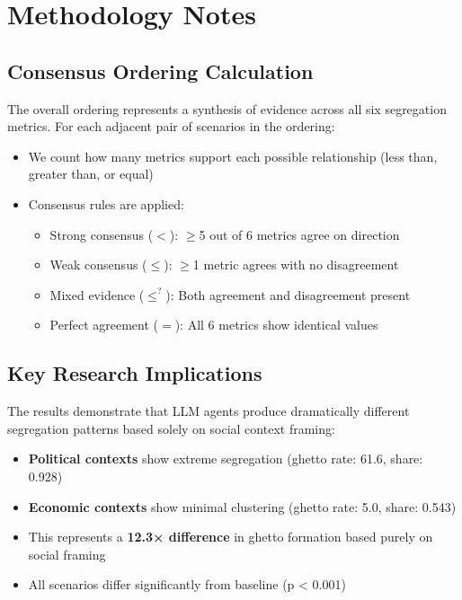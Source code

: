 \documentclass[11pt]{article}
\begin{document}


\section{Methodology Notes}

\subsection{Consensus Ordering Calculation}

The overall ordering represents a synthesis of evidence across all six segregation metrics. For each adjacent pair of scenarios in the ordering:

\begin{itemize}
\item We count how many metrics support each possible relationship (less than, greater than, or equal)
\item Consensus rules are applied:
  \begin{itemize}
  \item Strong consensus ($<$): $\geq$5 out of 6 metrics agree on direction
  \item Weak consensus ($\leq$): $\geq$1 metric agrees with no disagreement  
  \item Mixed evidence ($\leq^?$): Both agreement and disagreement present
  \item Perfect agreement ($=$): All 6 metrics show identical values
  \end{itemize}
\end{itemize}

\subsection{Key Research Implications}

The results demonstrate that LLM agents produce dramatically different segregation patterns based solely on social context framing:

\begin{itemize}
\item \textbf{Political contexts} show extreme segregation (ghetto rate: 61.6, share: 0.928)
\item \textbf{Economic contexts} show minimal clustering (ghetto rate: 5.0, share: 0.543)  
\item This represents a \textbf{12.3× difference} in ghetto formation based purely on social framing
\item All scenarios differ significantly from baseline (p < 0.001)
\end{itemize}
\end{document}
